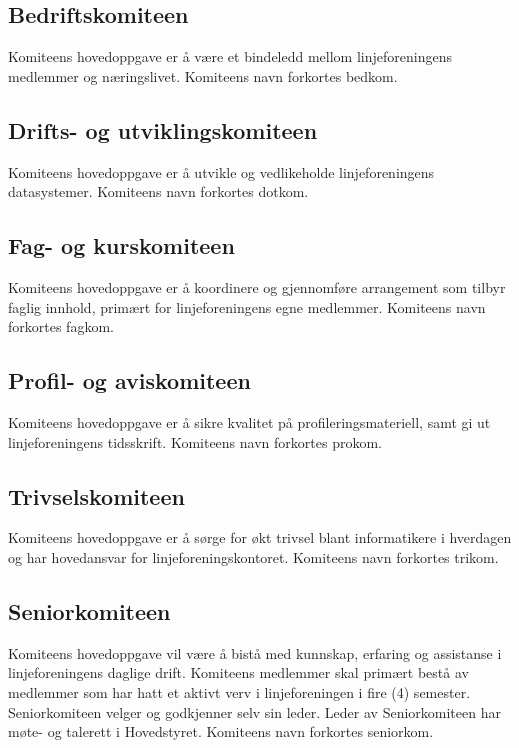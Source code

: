 \vspace{-10pt}
\subsection{Bedriftskomiteen}{
Komiteens hovedoppgave er å være et bindeledd mellom linjeforeningens medlemmer og næringslivet. Komiteens navn forkortes bedkom.
}

\vspace{-10pt}
\subsection{Drifts- og utviklingskomiteen}{
Komiteens hovedoppgave er å utvikle og vedlikeholde linjeforeningens datasystemer. Komiteens navn forkortes dotkom.

}

\vspace{-10pt}
\subsection{Fag- og kurskomiteen}{
Komiteens hovedoppgave er å koordinere og gjennomføre arrangement som tilbyr faglig innhold, primært for linjeforeningens egne medlemmer. Komiteens navn forkortes fagkom.
}

\vspace{-10pt}
\subsection{Profil- og aviskomiteen}{
Komiteens hovedoppgave er å sikre kvalitet på profileringsmateriell, samt gi ut linjeforeningens tidsskrift. Komiteens navn forkortes prokom.
}

\vspace{-10pt}
\subsection{Trivselskomiteen}{
Komiteens hovedoppgave er å sørge for økt trivsel blant informatikere i hverdagen og har hovedansvar for linjeforeningskontoret. Komiteens navn forkortes trikom.
}

\vspace{-10pt}
\subsection{Seniorkomiteen}{
Komiteens hovedoppgave vil være å bistå med kunnskap, erfaring og assistanse i linjeforeningens daglige drift. Komiteens medlemmer skal primært bestå av medlemmer som har hatt et aktivt verv i linjeforeningen i fire (4) semester. Seniorkomiteen velger og godkjenner selv sin leder. Leder av Seniorkomiteen har møte- og talerett i Hovedstyret. Komiteens navn forkortes seniorkom.
}

